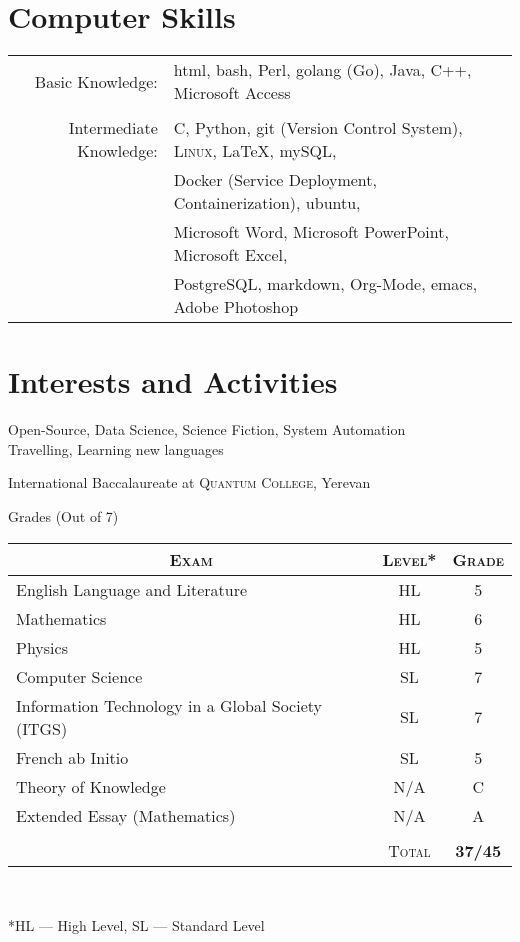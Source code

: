 \documentclass[a4paper,10pt]{article}
\begin{document}
\section{Computer Skills}
\begin{tabular}{rl}

  Basic Knowledge:& html, bash, Perl, golang (Go), Java, C++, Microsoft Access\\\\
  
  Intermediate Knowledge:& C, Python, git (Version Control System), \textsc{Linux}, \LaTeX, mySQL,\\&Docker (Service Deployment, Containerization), ubuntu,\\&
  Microsoft Word, Microsoft PowerPoint, Microsoft Excel,\\&PostgreSQL, markdown, Org-Mode, emacs, Adobe Photoshop\\
  
\end{tabular}

\section{Interests and Activities}
Open-Source, Data Science, Science Fiction, System Automation\\
Travelling, Learning new languages

\newpage
\par{\centering\Large \hypertarget{ib_grades}{International Baccalaureate at \textsc{Quantum College}, Yerevan}\par}\large{\centering Grades (Out of 7) \par}\normalsize

\begin{center}
\begin{tabular}{lcc}
\multicolumn{1}{c}{\textsc{Exam}}&\textsc{Level*}&\textsc{Grade}\\ \hline
  English Language and Literature	&HL&	5\\
  Mathematics	&HL&	6\\
  Physics	&HL&	5\\
  Computer Science & SL& 7\\
  Information Technology in a Global Society (ITGS) & SL& 7\\
  French ab Initio & SL & 5\\
  Theory of Knowledge & N/A & C\\
  Extended Essay (Mathematics) & N/A & A\\
& &\\\cline{2-3}
 &\textsc{Total}&\textbf{37/45}
\end{tabular}\\
\begin{flushleft}
\footnotesize{*HL --- High Level, SL --- Standard Level}
\end{flushleft}
\end{center}
\end{document}
